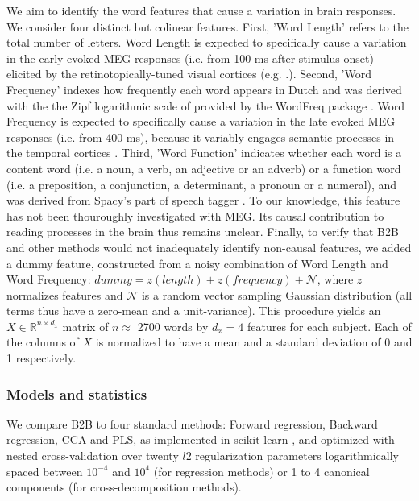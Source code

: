 We aim to identify the word features that cause a variation in brain responses. We consider four distinct but colinear features.
%
First, 'Word Length' refers to the total number of letters. Word Length is expected to specifically cause a variation in the early evoked MEG responses (i.e. from 100 ms after stimulus onset) elicited by the retinotopically-tuned visual cortices (e.g. \citep{pegado2014timing}.).
%
Second, 'Word Frequency' indexes how frequently each word appears in Dutch and was derived with the the Zipf logarithmic scale of \citep{van2014subtlex} provided by the WordFreq package \citep{speerwordfreq}. Word Frequency is expected to specifically cause a variation in the late evoked MEG responses (i.e. from 400 ms), because it variably engages semantic processes in the temporal cortices \citep{kutas2011thirty}.
%
Third, 'Word Function' indicates whether each word is a content word (i.e. a noun, a verb, an adjective or an adverb) or a function word (i.e. a preposition, a conjunction, a determinant, a pronoun or a numeral), and was derived from Spacy's part of speech tagger \citep{spacy2}. To our knowledge, this feature has not been thouroughly investigated with MEG. Its causal contribution to reading processes in the brain thus remains unclear.
%
Finally, to verify that B2B and other methods would not inadequately identify non-causal features, we added a dummy feature, constructed from a noisy combination of Word Length and Word Frequency:
$dummy = z(length) + z(frequency) + \mathcal{N}$, where $z$ normalizes features and $\mathcal{N}$ is a random vector sampling Gaussian distribution (all terms thus have a zero-mean and a unit-variance). This procedure yields an $X \in \mathbb{R}^{n \times d_x}$ matrix of $n\approx$ 2700 words by
$d_x=4$ features for each subject. Each of the columns of $X$ is normalized to
have a mean and a standard deviation of 0 and 1 respectively.

\subsubsection{Models and statistics}

We compare B2B to four standard methods: Forward regression, Backward regression, CCA and PLS, as implemented in scikit-learn \citep{sklearn}, and optimized with nested cross-validation over twenty $l2$ regularization parameters logarithmically spaced between $10^{-4}$ and $10^4$ (for regression methods) or 1 to 4 canonical components (for cross-decomposition methods).

